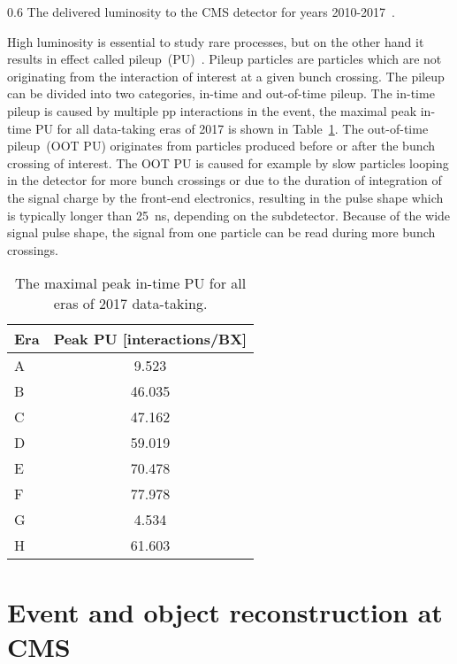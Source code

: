                  {0.6}       %
                 { The delivered luminosity to the CMS detector for years 2010-2017~\cite{website:CMSlumi}. }


High luminosity is essential to study rare processes, but on the other hand it results in effect called pileup~(PU)~\cite{Bayatian:2006nff}. Pileup particles are particles which are not originating from the interaction of interest at a given bunch crossing. The pileup can be divided into two categories, in-time and out-of-time pileup. The in-time pileup is caused by multiple pp interactions in the event, the maximal peak in-time PU for all data-taking eras of 2017 is shown in Table~\ref{tab:PU}.  The out-of-time pileup~(OOT PU) originates from particles produced before or after the bunch crossing of interest. The OOT PU is caused for example by slow particles looping in the detector for more bunch crossings or due to the duration of integration of the signal charge by the front-end electronics, resulting in the pulse shape which is typically longer than 25~ns, depending on the subdetector. Because of the wide signal pulse shape, the signal from one particle can be read during more bunch crossings.

\begin{table}[h]
\begin{center}
\begin{tabular}{|l|c|}
\hline
Era & Peak PU [interactions/BX]  \\
\hline
A & 9.523  \\
B & 46.035  \\
C & 47.162  \\
D & 59.019  \\
E & 70.478  \\
F & 77.978  \\
G & 4.534  \\
H & 61.603  \\
\hline
\end{tabular}
\caption[Table caption text]{The maximal peak in-time PU for all eras of 2017 data-taking. }
\label{tab:PU}
\end{center}
\end{table}
\newpage

\section{Event and object reconstruction at CMS~\label{sec:objects}}

